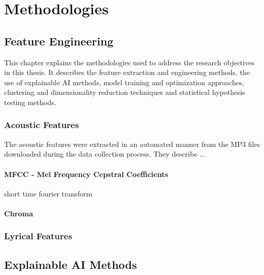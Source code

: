\chapter{Methodologies}
\label{cha:methodologies}

\section{Feature Engineering}
\label{sec:featureengineering}

This chapter explains the methodologies used to address the research objectives
in this thesis. It describes the feature extraction and  engineering methods,
the use of explainable AI methods, model training and optimization approaches,
clustering and dimensionality reduction techniques and statistical hypothesis
testing methods.


\subsection{Acoustic Features}
\label{sec:acousticfeatures}

The acoustic features were extracted in an automated manner from the MP3 files
downloaded during the data collection process. They describe ...

\subsubsection*{MFCC - Mel Frequency Cepstral Coefficients}
short time fourier transform


\subsubsection*{Chroma}


\subsection{Lyrical Features}
\label{sec:lyricalfeatures}


\section{Explainable AI Methods}
\label{sec:explainableaimethods}


